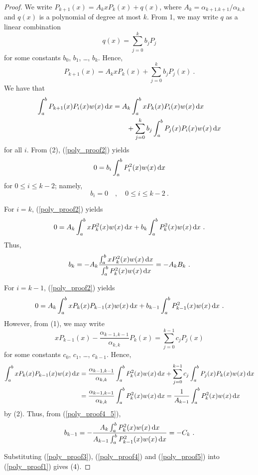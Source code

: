 \begin{proof}
  We write $\displaystyle P_{k+1}(x) = A_k x P_k(x) + q(x)$, where
$\displaystyle A_k = \alpha_{k+1.k+1}/\alpha_{k,k}$ and $q(x)$ is
a polynomial of degree at most $k$.  From 1, we may write $q$ as a linear
combination
\[
q(x) = \sum_{j=0}^k b_j P_j
\]
for some constants $b_0$, $b_1$, \ldots, $b_k$.  Hence,
\begin{equation} \label{poly_proof1}
P_{k+1}(x) = A_k x P_k(x) + \sum_{j=0}^k b_j P_j(x) \ .
\end{equation}
We have that
\begin{equation} \label{poly_proof2}
\begin{split}
\int_a^b P_{k+1}(x) P_i(x) w(x)\,\mathrm{d}x
&= A_k \int_a^b x P_k(x) P_i(x) w(x)\,\mathrm{d}x \\
& \qquad + \sum_{j=0}^k b_j \int_a^b P_j(x) P_i(x)w(x)\,\mathrm{d}x
\end{split}
\end{equation}
for all $i$.  From (2), (\ref{poly_proof2}) yields
\[
  0 = b_i \int_a^b P^2_i(x)w(x)\,\mathrm{d}x
\]
for $0\leq i \leq k-2$; namely,
\begin{equation} \label{poly_proof3}
b_i=0 \quad , \quad 0\leq i \leq k-2 \ .
\end{equation}

For $i=k$, (\ref{poly_proof2}) yields
\[
0 = A_k \int_a^b x P^2_k(x) w(x)\,\mathrm{d}x
+ b_k \int_a^b P^2_k(x)w(x)\,\mathrm{d}x \ .
\]
Thus,
\begin{equation} \label{poly_proof4}
b_k = - A_k \frac{\int_a^b x P^2_k(x) w(x)\,\mathrm{d}x}
{\int_a^b P^2_k(x)w(x)\,\mathrm{d}x} = - A_k B_k \  .
\end{equation}

For $i=k-1$, (\ref{poly_proof2}) yields
\begin{equation} \label{poly_proof4_5}
0 = A_k \int_a^b x P_k(x) P_{k-1}(x) w(x)\,\mathrm{d}x
+ b_{k-1} \int_a^b P^2_{k-1}(x)w(x)\,\mathrm{d}x \  .
\end{equation}
However, from (1), we may write
\[
x P_{k-1}(x) - \frac{\alpha_{k-1,k-1}}{\alpha_{k,k}}P_k(x) =
\sum_{j=0}^{k-1}c_j P_j(x)
\]
for some constants $c_0$, $c_1$, \ldots, $c_{k-1}$.  Hence,
\begin{align*}
\int_a^b x P_k(x) P_{k-1}(x) w(x)\,\mathrm{d}x
&= \frac{\alpha_{k-1,k-1}}{\alpha_{k,k}} \int_a^b P^2_k(x) w(x)\,\mathrm{d}x
+ \sum_{j=0}^{k-1}c_j \int_a^b P_j(x) P_k(x) w(x)\,\mathrm{d}x \\
&= \frac{\alpha_{k-1,k-1}}{\alpha_{k,k}} \int_a^b P^2_k(x) w(x)\,\mathrm{d}x
= \frac{1}{A_{k-1}} \int_a^b P^2_k(x) w(x) \,\mathrm{d}x
\end{align*}
by (2).  Thus, from (\ref{poly_proof4_5}),
\begin{equation} \label{poly_proof5}
b_{k-1} = - \frac{A_k \int_a^b P^2_k(x) w(x)\,\mathrm{d}x}
{A_{k-1} \int_a^b P^2_{k-1}(x)w(x)\,\mathrm{d}x} = - C_k\  .
\end{equation}

Substituting (\ref{poly_proof3}), (\ref{poly_proof4}) and
(\ref{poly_proof5}) into (\ref{poly_proof1}) gives (4).
\end{proof}

